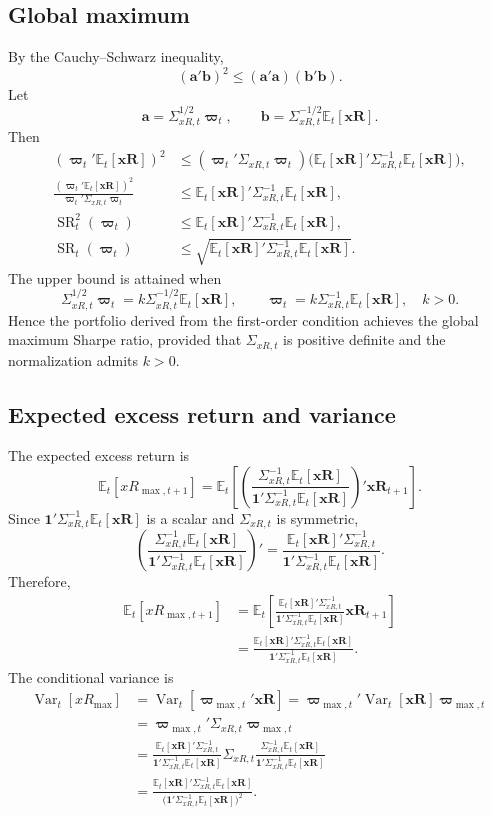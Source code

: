 \documentclass[11pt]{article}
\newcommand{\Et}{\mathbb{E}_t}
\newcommand{\Vt}{\operatorname{Var}_t}
\newcommand{\wt}{\boldsymbol{\varpi}_t}
\newcommand{\xr}{\mathbf{xR}_{t+1}}
\begin{document}
\subsection*{Global maximum}
By the Cauchy--Schwarz inequality,
\[
(\mathbf a'\mathbf b)^2\le(\mathbf a'\mathbf a)(\mathbf b'\mathbf b).
\]
Let
\[
\mathbf a=\Sigma_{xR,t}^{1/2}\wt,
\qquad \mathbf b=\Sigma_{xR,t}^{-1/2}\Et[\mathbf{xR}].
\]
Then
\begin{align*}
(\wt'\Et[\mathbf{xR}])^2
&\le(\wt'\Sigma_{xR,t}\wt)
\bigl(\Et[\mathbf{xR}]'\Sigma_{xR,t}^{-1}\Et[\mathbf{xR}]\bigr),\\
\frac{(\wt'\Et[\mathbf{xR}])^2}{\wt'\Sigma_{xR,t}\wt}
&\le\Et[\mathbf{xR}]'\Sigma_{xR,t}^{-1}\Et[\mathbf{xR}],\\
\operatorname{SR}_t^2(\wt)
&\le\Et[\mathbf{xR}]'\Sigma_{xR,t}^{-1}\Et[\mathbf{xR}],\\
\operatorname{SR}_t(\wt)
&\le\sqrt{\Et[\mathbf{xR}]'\Sigma_{xR,t}^{-1}\Et[\mathbf{xR}]}.
\end{align*}
The upper bound is attained when
\[
\Sigma_{xR,t}^{1/2}\wt
=k\Sigma_{xR,t}^{-1/2}\Et[\mathbf{xR}],
\qquad
\wt=k\Sigma_{xR,t}^{-1}\Et[\mathbf{xR}],\quad k>0.
\]
Hence the portfolio derived from the first-order condition achieves the global
maximum Sharpe ratio, provided that $\Sigma_{xR,t}$ is positive definite and
the normalization admits $k>0$.

\subsection*{Expected excess return and variance}
The expected excess return is
\[
\Et[xR_{\max,t+1}]
=\Et\left[\left(
\frac{\Sigma_{xR,t}^{-1}\Et[\mathbf{xR}]}
{\mathbf1'\Sigma_{xR,t}^{-1}\Et[\mathbf{xR}]}
\right)'\xr\right].
\]
Since $\mathbf1'\Sigma_{xR,t}^{-1}\Et[\mathbf{xR}]$ is a scalar and
$\Sigma_{xR,t}$ is symmetric,
\[
\left(\frac{\Sigma_{xR,t}^{-1}\Et[\mathbf{xR}]}
{\mathbf1'\Sigma_{xR,t}^{-1}\Et[\mathbf{xR}]}\right)'
=\frac{\Et[\mathbf{xR}]'\Sigma_{xR,t}^{-1}}
{\mathbf1'\Sigma_{xR,t}^{-1}\Et[\mathbf{xR}]}.
\]
Therefore,
\begin{align*}
\Et[xR_{\max,t+1}]
&=\Et\left[\frac{\Et[\mathbf{xR}]'\Sigma_{xR,t}^{-1}}
{\mathbf1'\Sigma_{xR,t}^{-1}\Et[\mathbf{xR}]}\xr\right]\\
&=\frac{\Et[\mathbf{xR}]'\Sigma_{xR,t}^{-1}\Et[\mathbf{xR}]}
{\mathbf1'\Sigma_{xR,t}^{-1}\Et[\mathbf{xR}]}.
\end{align*}
The conditional variance is
\begin{align*}
\Vt[xR_{\max}]
&=\Vt[\boldsymbol{\varpi}_{\max,t}'\mathbf{xR}]
=\boldsymbol{\varpi}_{\max,t}'\Vt[\mathbf{xR}]
\boldsymbol{\varpi}_{\max,t}\\
&=\boldsymbol{\varpi}_{\max,t}'\Sigma_{xR,t}
\boldsymbol{\varpi}_{\max,t}\\
&=\frac{\Et[\mathbf{xR}]'\Sigma_{xR,t}^{-1}}
{\mathbf1'\Sigma_{xR,t}^{-1}\Et[\mathbf{xR}]}
\Sigma_{xR,t}
\frac{\Sigma_{xR,t}^{-1}\Et[\mathbf{xR}]}
{\mathbf1'\Sigma_{xR,t}^{-1}\Et[\mathbf{xR}]}\\
&=\frac{\Et[\mathbf{xR}]'\Sigma_{xR,t}^{-1}\Et[\mathbf{xR}]}
{\bigl(\mathbf1'\Sigma_{xR,t}^{-1}\Et[\mathbf{xR}]\bigr)^2}.
\end{align*}
\end{document}
